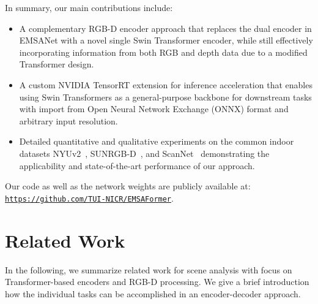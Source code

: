 \documentclass[conference]{IEEEtran}
\begin{document}
In summary, our main contributions include:
\begin{itemize}[leftmargin=5mm]
\item A complementary RGB-D encoder approach that replaces the dual encoder in EMSANet with a novel single Swin Transformer encoder, while still effectively incorporating information from both RGB and depth data due to a modified Transformer design.
\item A custom NVIDIA TensorRT extension for inference acceleration that enables using Swin Transformers as a general-purpose backbone for downstream tasks with import from Open Neural Network Exchange (ONNX) format and arbitrary input resolution.
\item Detailed quantitative and qualitative experiments on the common indoor datasets NYUv2~\cite{NYUv2-eccv2012}, SUNRGB-D~\cite{SUNRGBD-cvpr2015}, and ScanNet~\cite{scannet-cvpr2017} demonstrating the applicability and state-of-the-art performance of our approach.
\end{itemize}

Our code as well as the network weights are publicly available at: {\small\href{https://github.com/TUI-NICR/EMSAFormer}{\texttt{\url{https://github.com/TUI-NICR/EMSAFormer}}}}.

 \section{Related Work}
\label{sec:related_work}
In the following, we summarize related work for scene analysis with focus on Transformer-based encoders and RGB-D processing.
We give a brief introduction how the individual tasks can be accomplished in an encoder-decoder approach.
\end{document}
